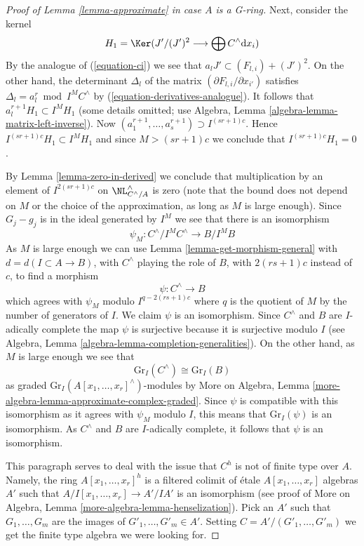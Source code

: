 \begin{proof}[Proof of Lemma \ref{lemma-approximate} in case $A$ is a G-ring]
\medskip\noindent
Next, consider the kernel
$$
H_1 = \Ker(J'/(J')^2 \longrightarrow \bigoplus C^\wedge \text{d}x_i)
$$
By the analogue of (\ref{equation-ci}) we see that
$a_l J' \subset (F_{l, i}) + (J')^2$. On the other hand, the
determinant $\Delta_l$ of the matrix $(\partial F_{l, i}/ \partial x_{i'})$
satisfies $\Delta_l = a_l^r \bmod I^M C^\wedge$ by
(\ref{equation-derivatives-analogue}). It follows that
$a_l^{r + 1} H_1 \subset I^M H_1$ (some details omitted; use
Algebra, Lemma \ref{algebra-lemma-matrix-left-inverse}).
Now $(a_1^{r + 1}, \ldots, a_s^{r + 1}) \supset I^{(sr + 1)c}$.
Hence $I^{(sr + 1)c}H_1 \subset I^M H_1$ and since $M > (sr + 1)c$
we conclude that $I^{(sr + 1)c}H_1 = 0$.

\medskip\noindent
By Lemma \ref{lemma-zero-in-derived}
we conclude that multiplication by an element
of $I^{2(sr + 1)c}$ on $\NL_{C^\wedge/A}^\wedge$ is zero
(note that the bound does not depend on $M$ or the choice
of the approximation, as long as $M$ is large enough).
Since $G_j - g_j$ is in the ideal generated by $I^M$
we see that there is an isomorphism
$$
\psi_M : C^\wedge/I^MC^\wedge \to B/I^MB
$$
As $M$ is large enough we can use
Lemma \ref{lemma-get-morphism-general}
with $d = d(I \subset A \to B)$,
with $C^\wedge$ playing the role of $B$,
with $2(rs + 1)c$ instead of $c$,
to find a morphism
$$
\psi : C^\wedge \longrightarrow B
$$
which agrees with $\psi_M$ modulo $I^{q - 2(rs + 1)c}$ where
$q$ is the quotient of $M$ by the number of generators of $I$.
We claim $\psi$ is an isomorphism. Since $C^\wedge$ and $B$
are $I$-adically complete the map $\psi$ is surjective
because it is surjective modulo $I$ (see
Algebra, Lemma \ref{algebra-lemma-completion-generalities}).
On the other hand, as $M$ is large enough we see that
$$
\text{Gr}_I(C^\wedge) \cong \text{Gr}_I(B)
$$
as graded $\text{Gr}_I(A[x_1, \ldots, x_r]^\wedge)$-modules
by More on Algebra, Lemma \ref{more-algebra-lemma-approximate-complex-graded}.
Since $\psi$ is compatible with this isomorphism as it
agrees with $\psi_M$ modulo $I$, this means that $\text{Gr}_I(\psi)$ is an
isomorphism. As $C^\wedge$ and $B$ are
$I$-adically complete, it follows that $\psi$ is an isomorphism.

\medskip\noindent
This paragraph serves to deal with the issue that $C^h$
is not of finite type over $A$. Namely, the ring
$A[x_1, \ldots, x_r]^h$ is a filtered colimit of
\'etale $A[x_1, \ldots, x_r]$ algebras $A'$ such that
$A/I[x_1, \ldots, x_r] \to A'/IA'$ is an isomorphism
(see proof of More on Algebra, Lemma \ref{more-algebra-lemma-henselization}).
Pick an $A'$ such that $G_1, \ldots, G_m$ are the
images of $G'_1, \ldots, G'_m \in A'$.
Setting $C = A'/(G'_1, \ldots, G'_m)$ we get the finite
type algebra we were looking for.
\end{proof}

